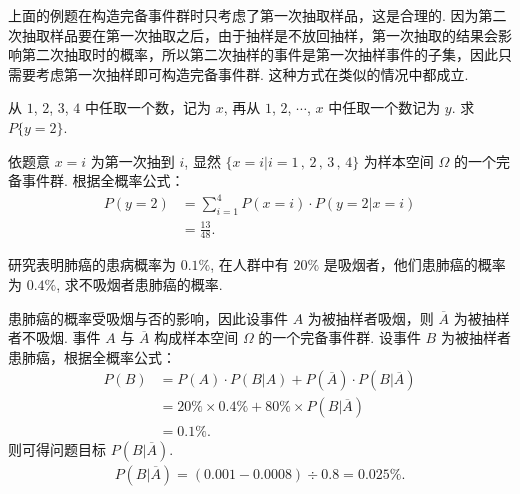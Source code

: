 \documentclass[12pt, a4paper, oneside, UTF8]{ctexbook}
\begin{document}
\begin{rmk}
    上面的例题在构造完备事件群时只考虑了第一次抽取样品，这是合理的. 因为第二次抽取样品要在第一次抽取之后，由于抽样是不放回抽样，第一次抽取的结果会影响第二次抽取时的概率，所以第二次抽样的事件是第一次抽样事件的子集，因此只需要考虑第一次抽样即可构造完备事件群. 这种方式在类似的情况中都成立.
\end{rmk}

\begin{example}
    从 \(1\), \(2\), \(3\), \(4\) 中任取一个数，记为 \(x\), 再从 \(1\), \(2\), \(\cdots\), \(x\) 中任取一个数记为 \(y\). 求 \(P\{y = 2\}\).
\end{example}

\begin{solution}
    依题意 \(x = i\) 为第一次抽到 \(i\), 显然 \(\{x = i | i = 1\,,\,2\,,\,3\,,\,4\}\) 为样本空间 \(\Omega\) 的一个完备事件群. 根据全概率公式：
    \begin{align*}
        P\left(y = 2\right) &= \sum_{i = 1}^{4} P\left(x = i\right) \cdot P\left(y = 2 | x = i\right)\\ 
        &= \frac{13}{48}.
    \end{align*}
\end{solution}

\begin{example}
    研究表明肺癌的患病概率为 \(0.1\%\), 在人群中有 \(20\%\) 是吸烟者，他们患肺癌的概率为 \(0.4\%\), 求不吸烟者患肺癌的概率.
\end{example}

\begin{solution}
    患肺癌的概率受吸烟与否的影响，因此设事件 \(A\) 为被抽样者吸烟，则 \(\overline{A}\) 为被抽样者不吸烟. 事件 \(A\) 与 \(\overline{A}\) 构成样本空间 \(\Omega\) 的一个完备事件群. 设事件 \(B\) 为被抽样者患肺癌，根据全概率公式：
    \begin{align*}
        P\left(B\right) &= P\left(A\right) \cdot P\left(B | A\right) + P\left(\overline{A}\right) \cdot P\left(B | \overline{A}\right) \\
        &= 20\% \times 0.4\% + 80\%\times P\left(B | \overline{A}\right)\\
        &= 0.1\%.
    \end{align*}
    则可得问题目标 \(P\left(B|\overline{A}\right)\).
    \begin{align*}
        P\left(B|\overline{A}\right) = (0.001 - 0.0008) \div 0.8 = 0.025\%.
    \end{align*}
\end{solution}
\end{document}
